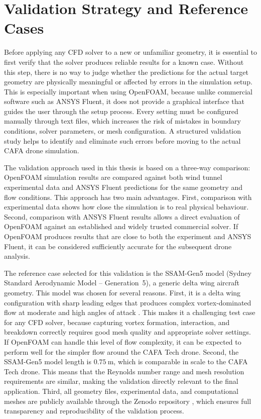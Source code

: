 
\section{Validation Strategy and Reference Cases}
Before applying any CFD solver to a new or unfamiliar geometry, it is essential to first verify that the solver produces reliable results for a known case. Without this step, there is no way to judge whether the predictions for the actual target geometry are physically meaningful or affected by errors in the simulation setup. This is especially important when using OpenFOAM, because unlike commercial software such as ANSYS Fluent, it does not provide a graphical interface that guides the user through the setup process. Every setting must be configured manually through text files, which increases the risk of mistakes in boundary conditions, solver parameters, or mesh configuration. A structured validation study helps to identify and eliminate such errors before moving to the actual CAFA drone simulation.

The validation approach used in this thesis is based on a three-way comparison: OpenFOAM simulation results are compared against both wind tunnel experimental data and ANSYS Fluent predictions for the same geometry and flow conditions. This approach has two main advantages. First, comparison with experimental data shows how close the simulation is to real physical behaviour. Second, comparison with ANSYS Fluent results allows a direct evaluation of OpenFOAM against an established and widely trusted commercial solver. If OpenFOAM produces results that are close to both the experiment and ANSYS Fluent, it can be considered sufficiently accurate for the subsequent drone analysis.

The reference case selected for this validation is the SSAM-Gen5 model (Sydney Standard Aerodynamic Model -- Generation~5), a generic delta wing aircraft geometry. This model was chosen for several reasons. First, it is a delta wing configuration with sharp leading edges that produces complex vortex-dominated flow at moderate and high angles of attack \cite{Giannelis2023SSAMGen5}. This makes it a challenging test case for any CFD solver, because capturing vortex formation, interaction, and breakdown correctly requires good mesh quality and appropriate solver settings. If OpenFOAM can handle this level of flow complexity, it can be expected to perform well for the simpler flow around the CAFA Tech drone. Second, the SSAM-Gen5 model length is $0.75~\mathrm{m}$, which is comparable in scale to the CAFA Tech drone. This means that the Reynolds number range and mesh resolution requirements are similar, making the validation directly relevant to the final application. Third, all geometry files, experimental data, and computational meshes are publicly available through the Zenodo repository \cite{Giannelis2023SSAMGen5}, which ensures full transparency and reproducibility of the validation process.


